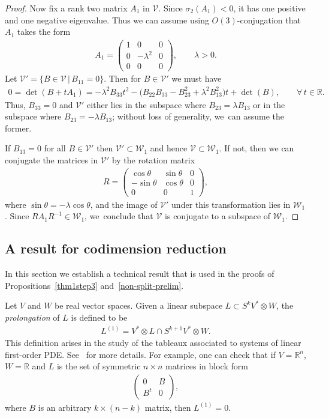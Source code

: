\documentclass[pdftex]{sigma}
\def\R{\mathbb{R}}
\def\V{\mathscr{V}}
\def\W{\mathscr{W}}
\numberwithin{equation}{section}
\begin{document}
\begin{proof}
Now fix a rank two matrix $A_1$ in $\V$. Since $\sigma_2 (A_1) < 0$, it has one positive and one negative eigenvalue. Thus we can assume using $O(3)$-conjugation that $A_1$ takes the form
\begin{gather*}
A_1 = \begin{pmatrix} 1 & 0 & 0 \\ 0 & -\lambda^2 & 0 \\ 0 & 0 & 0 \end{pmatrix} , \qquad \lambda > 0.
\end{gather*}
Let $\V' = \{ B \in \V \,|\, B_{11}=0\}$. Then for $B \in \V'$ we must have
\begin{gather*}
0 = \det(B + t A_1) = -\lambda^2 B_{33}t^2 - \big(B_{22}B_{33} - B_{23}^2 + \lambda^2 B_{13}^2\big)t + \det(B), \qquad \forall\, t \in \R.
\end{gather*}
Thus, $B_{33}=0$ and $\V'$ either lies in the subspace where $B_{23}=\lambda B_{13}$ or in the subspace where $B_{23}=-\lambda B_{13}$; without loss of generality, we~can assume the former.

If $B_{13}=0$ for all $B\in \V'$ then $\V' \subset \W_1$ and hence $\V \subset \W_1$. If not, then we can conjugate the matrices in $\V'$ by the rotation matrix
\begin{gather*}
R = \begin{pmatrix} \cos \theta & \sin \theta & 0 \\ -\sin\theta & \cos \theta & 0 \\ 0 & 0 & 1\end{pmatrix} ,
\end{gather*}
where $\sin\theta=-\lambda \cos \theta$, and the image of $\V'$ under this transformation lies in $\W_1$. Since $R A_1 R^{-1} \in \W_1$, we~conclude that $\V$ is conjugate to a subspace of $\W_1$.
\end{proof}

\subsection{A result for codimension reduction} \label{codim-reduction-sec}

In this section we establish a technical result that is used in the proofs of Propositions~\ref{thm1step3} and~\ref{non-split-prelim}.

Let $V$ and $W$ be real vector spaces. Given a linear subspace $L \subset S^k V^* \otimes W$, the \emph{prolongation} of $L$ is defined to be
\begin{gather*}
L^{(1)} = V^* \otimes L \cap S^{k+1} V^* \otimes W.
\end{gather*}
This definition arises in the study of the tableaux associated to systems of linear first-order PDE. See~\cite[Chapter VIII]{BCG3} for more details. For example, one can check that if $V=\R^n$, $W=\R$ and $L$ is the set of symmetric $n\times n$ matrices in block form{\samepage
\begin{gather*}
\begin{pmatrix} 0 & B \\ B^t & 0 \end{pmatrix},
\end{gather*}
where $B$ is an arbitrary $k \times (n-k)$ matrix, then $L^{(1)} = 0$.}
\end{document}
